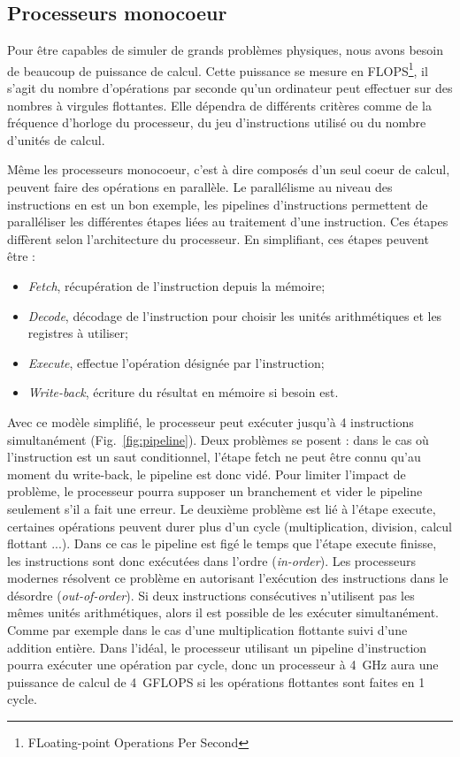 \subsection{Processeurs monocoeur}
Pour être capables de simuler de grands problèmes physiques, nous avons besoin de beaucoup de puissance de calcul.
%
Cette puissance se mesure en FLOPS\footnote{FLoating-point Operations Per Second}, il s'agit du nombre d'opérations par seconde qu'un ordinateur peut effectuer sur des nombres à virgules flottantes.
%
Elle dépendra de différents critères comme de la fréquence d'horloge du processeur, du jeu d'instructions utilisé ou du nombre d'unités de calcul.


Même les processeurs monocoeur, c'est à dire composés d'un seul coeur de calcul, peuvent faire des opérations en parallèle.
%
Le parallélisme au niveau des instructions en est un bon exemple, les pipelines d'instructions permettent de paralléliser les différentes étapes liées au traitement d'une instruction.
%
Ces étapes diffèrent selon l'architecture du processeur.
%
En simplifiant, ces étapes peuvent être :
\begin{itemize}
  \item {\em Fetch}, récupération de l'instruction depuis la mémoire;
  \item {\em Decode}, décodage de l'instruction pour choisir les unités arithmétiques et les registres à utiliser;
  \item {\em Execute}, effectue l'opération désignée par l'instruction;
  \item {\em Write-back}, écriture du résultat en mémoire si besoin est.
\end{itemize}
%
Avec ce modèle simplifié, le processeur peut exécuter jusqu'à 4 instructions simultanément (Fig.~\ref{fig:pipeline}).
%
Deux problèmes se posent : dans le cas où l'instruction est un saut conditionnel, l'étape fetch ne peut être connu qu'au moment du write-back, le pipeline est donc vidé.
%
Pour limiter l'impact de problème, le processeur pourra supposer un branchement et vider le pipeline seulement s'il a fait une erreur.
%
Le deuxième problème est lié à l'étape execute, certaines opérations peuvent durer plus d'un cycle (multiplication, division, calcul flottant ...).
%
Dans ce cas le pipeline est figé le temps que l'étape execute finisse, les instructions sont donc exécutées dans l'ordre ({\em in-order}).
%
Les processeurs modernes résolvent ce problème en autorisant l'exécution des instructions dans le désordre ({\em out-of-order}).
%
Si deux instructions consécutives n'utilisent pas les mêmes unités arithmétiques, alors il est possible de les exécuter simultanément.
%
Comme par exemple dans le cas d'une multiplication flottante suivi d'une addition entière.
%
Dans l'idéal, le processeur utilisant un pipeline d'instruction pourra exécuter une opération par cycle, donc un processeur à 4~GHz aura une puissance de calcul de 4~GFLOPS si les opérations flottantes sont faites en 1 cycle.


